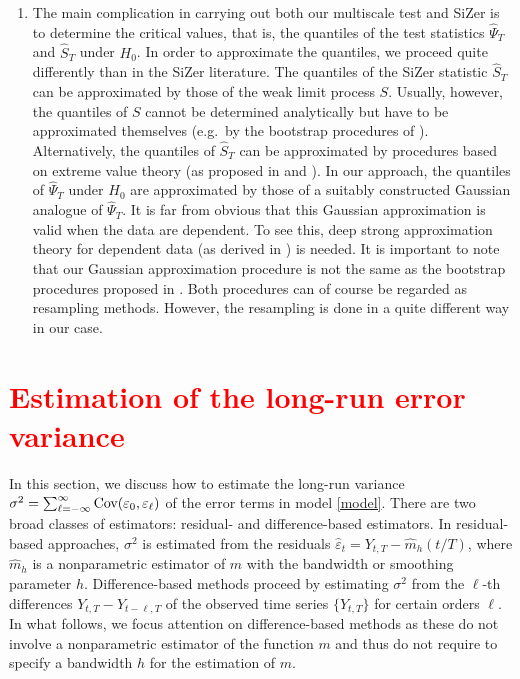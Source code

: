 \begin{enumerate}[label=(\roman*), leftmargin=0.75cm]
\item The main complication in carrying out both our multiscale test and SiZer is to determine the critical values, that is, the quantiles of the test statistics $\widehat{\Psi}_T$ and $\widehat{S}_T$ under $H_0$. In order to approximate the quantiles, we proceed quite differently than in the SiZer literature. The quantiles of the SiZer statistic $\widehat{S}_T$ can be approximated by those of the weak limit process $S$. Usually, however, the quantiles of $S$ cannot be determined analytically but have to be approximated themselves (e.g.\ by the bootstrap procedures of \cite{ChaudhuriMarron1999, ChaudhuriMarron2000}). Alternatively, the quantiles of $\widehat{S}_T$ can be approximated by procedures based on extreme value theory (as proposed in \cite{HannigMarron2006} and \cite{ParkHannigKang2009}). In our approach, the quantiles of $\widehat{\Psi}_T$ under $H_0$ are approximated by those of a suitably constructed Gaussian analogue of $\widehat{\Psi}_T$. It is far from obvious that this Gaussian approximation is valid when the data are dependent. To see this, deep strong approximation theory for dependent data (as derived in \cite{BerkesLiuWu2014}) is needed. It is important to note that our Gaussian approximation procedure is not the same as the bootstrap procedures proposed in \cite{ChaudhuriMarron1999, ChaudhuriMarron2000}. Both procedures can of course be regarded as resampling methods. However, the resampling is done in a quite different way in our case.

\end{enumerate}



\section{\textcolor{red}{Estimation of the long-run error variance}}\label{sec-error-var}


In this section, we discuss how to estimate the long-run variance $\sigma^2 = \sum\nolimits_{\ell=-\infty}^{\infty} \textnormal{Cov}(\varepsilon_0,\varepsilon_{\ell})$ of the error terms in model \eqref{model}. There are two broad classes of estimators: residual- and difference-based estimators. In residual-based approaches, $\sigma^2$ is estimated from the residuals $\widehat{\varepsilon}_t = Y_{t,T} - \widehat{m}_h(t/T)$, where $\widehat{m}_h$ is a nonparametric estimator of $m$ with the bandwidth or smoothing parameter $h$. Difference-based methods proceed by estimating $\sigma^2$ from the $\ell$-th differences $Y_{t,T} - Y_{t-\ell,T}$ of the observed time series $\{Y_{t,T}\}$ for certain orders $\ell$. In what follows, we focus attention on difference-based methods as these do not involve a nonparametric estimator of the function $m$ and thus do not require to specify a bandwidth $h$ for the estimation of $m$. 


